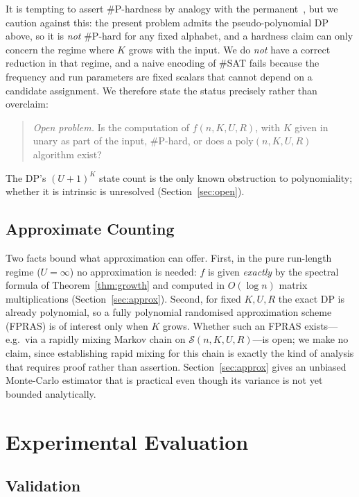 \documentclass[a4paper,12pt]{article}
\begin{document}
It is tempting to assert $\#\mathrm{P}$-hardness by analogy with the
permanent~\cite{valiant1979}, but we caution against this: the present
problem admits the pseudo-polynomial DP above, so it is \emph{not}
$\#\mathrm{P}$-hard for any fixed alphabet, and a hardness claim can
only concern the regime where $K$ grows with the input.  We do
\emph{not} have a correct reduction in that regime, and a naive
encoding of \#SAT fails because the frequency and run parameters are
fixed scalars that cannot depend on a candidate assignment.  We
therefore state the status precisely rather than overclaim:
\begin{quote}
\emph{Open problem.} Is the computation of $f(n,K,U,R)$, with $K$ given
in unary as part of the input, $\#\mathrm{P}$-hard, or does a
$\mathrm{poly}(n,K,U,R)$ algorithm exist?
\end{quote}
The DP's $(U+1)^K$ state count is the only known obstruction to
polynomiality; whether it is intrinsic is unresolved
(Section~\ref{sec:open}).

\subsection{Approximate Counting}

Two facts bound what approximation can offer.  First, in the pure
run-length regime ($U=\infty$) no approximation is needed: $f$ is given
\emph{exactly} by the spectral formula of Theorem~\ref{thm:growth} and
computed in $O(\log n)$ matrix multiplications
(Section~\ref{sec:approx}).  Second, for fixed $K,U,R$ the exact DP is
already polynomial, so a fully polynomial randomised approximation
scheme (FPRAS) is of interest only when $K$ grows.  Whether such an
FPRAS exists---e.g.\ via a rapidly mixing Markov chain on
$\mathcal S(n,K,U,R)$---is open; we make no claim, since establishing
rapid mixing for this chain is exactly the kind of analysis that
requires proof rather than assertion.  Section~\ref{sec:approx} gives
an unbiased Monte-Carlo estimator that is practical even though its
variance is not yet bounded analytically.

\section{Experimental Evaluation}
\label{sec:experiments}

\subsection{Validation}
\end{document}
